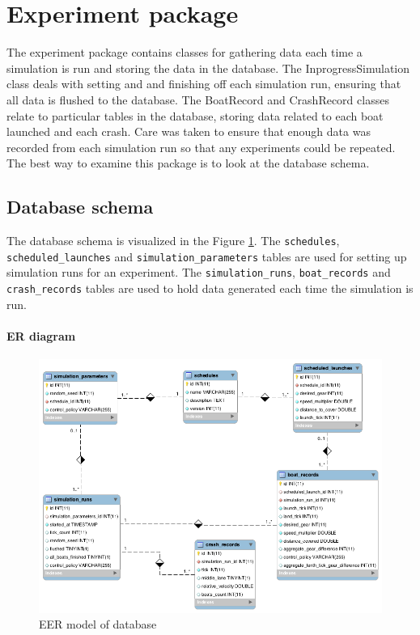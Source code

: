 \section{Experiment package}\label{software:experiment}
The experiment package contains classes for gathering data each time a
simulation is run and storing the data in the database. The
InprogressSimulation class deals with setting and and finishing off
each simulation run, ensuring that all data is flushed to the
database. The BoatRecord and CrashRecord classes relate to particular
tables in the database, storing data related to each boat launched and
each crash. Care was taken to ensure that enough data was recorded
from each simulation run so that any experiments could be repeated.
The best way to examine this package is to look at the database schema.

\subsection{Database schema}\label{software:experiment:db}

The database schema is visualized in the Figure
\ref{software:fig:eer}. The \texttt{schedules}, \texttt{scheduled\_launches} and
\texttt{simulation\_parameters} tables are used for setting up simulation runs for an
experiment. The \texttt{simulation\_runs}, \texttt{boat\_records} and
\texttt{crash\_records} tables are used to hold data generated each
time the simulation is run.

\paragraph{ER diagram}

\begin{figure}
\begin{center}
  \includegraphics[scale=0.3]{images/eer.png}
  \caption{EER model of database}
  \label{software:fig:eer}
\end{center}
\end{figure}

